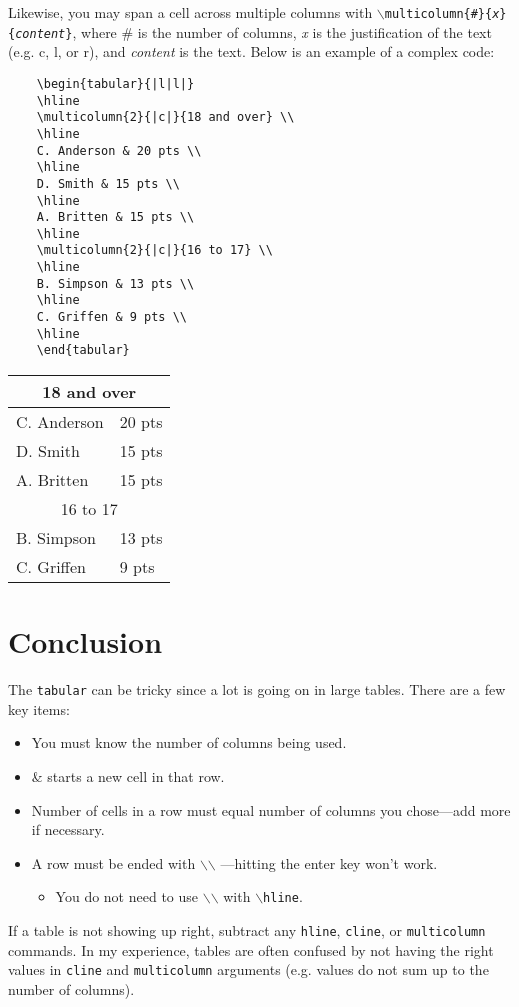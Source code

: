 \documentclass{article}
\begin{document}
Likewise, you may span a cell across multiple columns with \texttt{$\backslash$multicolumn\{\#\}\{\textit{x}\}\{\textit{content}\}}, where \# is the number of columns, \textit{x} is the justification of the text (e.g. c, l, or r), and \textit{content} is the text. Below is an example of a complex code:
\begin{verbatim}
	\begin{tabular}{|l|l|}
	\hline
	\multicolumn{2}{|c|}{18 and over} \\
	\hline
	C. Anderson & 20 pts \\
	\hline
	D. Smith & 15 pts \\
	\hline
	A. Britten & 15 pts \\
	\hline
	\multicolumn{2}{|c|}{16 to 17} \\
	\hline
	B. Simpson & 13 pts \\
	\hline
	C. Griffen & 9 pts \\
	\hline
	\end{tabular}
\end{verbatim}
	\begin{tabular}{|l|l|}
	\hline
	\multicolumn{2}{|c|}{18 and over} \\
	\hline
	C. Anderson & 20 pts \\
	\hline
	D. Smith & 15 pts \\
	\hline
	A. Britten & 15 pts \\
	\hline
	\multicolumn{2}{|c|}{16 to 17} \\
	\hline
	B. Simpson & 13 pts \\
	\hline
	C. Griffen & 9 pts \\
	\hline
	\end{tabular}

\section{Conclusion}


The \texttt{tabular} can be tricky since a lot is going on in large tables. There are a few key items:
\begin{itemize}
	\item You must know the number of columns being used.
	\item \& starts a new cell in that row.
	\item Number of cells in a row must equal number of columns you chose---add more if necessary.
	\item A row must be ended with $\backslash$$\backslash$ ---hitting the enter key won't work.
		\begin{itemize}
			\item You do not need to use $\backslash$$\backslash$ with \texttt{$\backslash$hline}.
		\end{itemize}
\end{itemize}
If a table is not showing up right, subtract any \texttt{hline}, \texttt{cline}, or \texttt{multicolumn} commands. In my experience, tables are often confused by not having the right values in \texttt{cline} and \texttt{multicolumn} arguments (e.g. values do not sum up to the number of columns).
\end{document}
